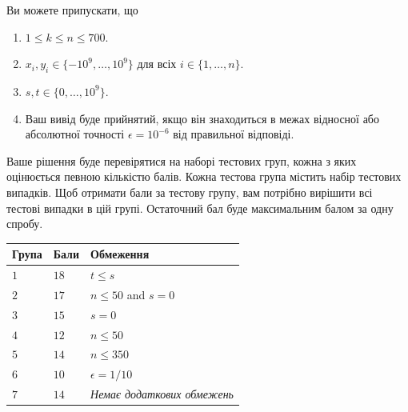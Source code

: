 Ви можете припускати, що
\begin{enumerate}
\item $1\leq k\leq n\leq 700$. %
\item $x_i, y_i\in \{-10^9,\ldots, 10^9\}$ для всіх $i\in\{1,\ldots,n\}$. %
\item $s,t\in \{0,\ldots, 10^9\}$. %
\item Ваш вивід буде прийнятий, якщо він знаходиться в межах відносної або абсолютної точності $\epsilon = 10^{-6}$ від правильної відповіді.
\end{enumerate}


Ваше рішення буде перевірятися на наборі тестових груп, кожна з яких оцінюється певною кількістю балів.
Кожна тестова група містить набір тестових випадків.
Щоб отримати бали за тестову групу, вам потрібно вирішити всі тестові випадки в цій групі.
Остаточний бал буде максимальним балом за одну спробу.

\medskip
\noindent
\begin{tabular}{lll}
  Група & Бали & Обмеження\\\hline
  $1$ & $18$ &  $t\leq s$\\
  $2$ & $17$ & $n\le 50$ and $s=0$\\
  $3$ & $15$ & $s=0$\\
  $4$ & $12$ & $n\leq 50$\\
  $5$ & $14$ & $n\leq 350$\\
  $6$ & $10$ & $\epsilon = 1/10$\\
  $7$ & $14$ & \emph{Немає додаткових обмежень}\\
\end{tabular}



